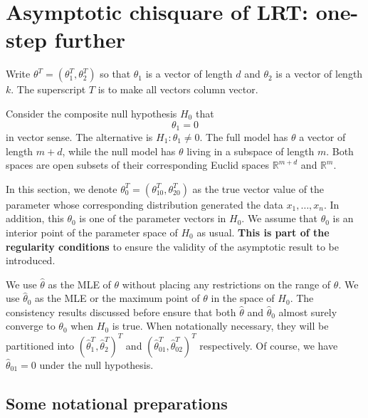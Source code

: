 \section{Asymptotic chisquare of LRT: one-step further}

Write $\theta^T = (\theta_1^T, \theta_2^T)$ so that $\theta_1$ is a
vector of length $d$ and $\theta_2$ is a vector of length $k$.
The superscript $T$ is to make all vectors column vector.

Consider the composite null hypothesis $H_0$ that 
\[
\theta_1 = 0
\]
in vector sense. The alternative is $H_1: \theta_1 \neq 0$.
The full model has $\theta$ a vector of length $m+d$, while
the null model has $\theta$ living in a subspace of length $m$.
Both spaces are open subsets of their corresponding
Euclid spaces $\mathbb{R}^{m+d}$ and $\mathbb{R}^m$.

In this section, we denote $\theta_0^T = (\theta^T_{10}, \theta^T_{20})$ 
as the true vector value of the
parameter whose corresponding distribution generated the data $x_1, \ldots, x_n$.
In addition, this $\theta_0$ is one of the parameter vectors in $H_0$.
We assume that $\theta_0$ is an interior point of the parameter space
of $H_0$ as usual. 
{\bf This is part of the regularity conditions} to ensure the validity
of the asymptotic result to be introduced.

We use $\hat \theta$ as the MLE of $\theta$ without placing
any restrictions on the range of $\theta$. We use $\hat \theta_0$
as the MLE or the maximum point of $\theta$ in the space of $H_0$. 
The consistency results discussed before ensure that
both $\hat \theta$ and $\hat \theta_0$ almost surely
converge to $\theta_0$ when $H_0$ is true. 
When notationally necessary, they will be partitioned into $(\hat \theta^T_1, \hat \theta^T_2)^T$
and $(\hat \theta^T_{01}, \hat \theta^T_{02})^T$ respectively.
Of course, we have $\hat \theta_{01} = 0$ under the null hypothesis.

\subsection{Some notational preparations}

